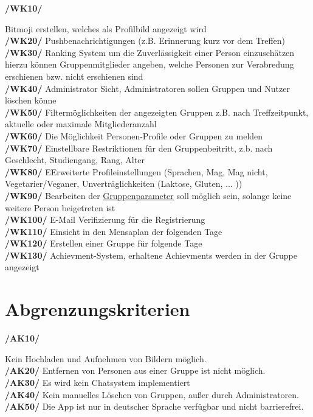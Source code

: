 \documentclass[a4paper]{scrreprt}
\begin{document}
\begin{addmargin}[25pt]{0pt} 
\hypertarget{wk10}{\textbf{/WK10/}} Bitmoji erstellen, welches als Profilbild angezeigt wird \\
\hypertarget{wk20}{\textbf{/WK20/}} Pushbenachrichtigungen (z.B. Erinnerung kurz vor dem Treffen) \\
\hypertarget{wk30}{\textbf{/WK30/}} Ranking System um die Zuverlässigkeit einer Person einzuschätzen \\ 
	hierzu können Gruppenmitglieder angeben, welche Personen zur Verabredung erschienen bzw. nicht erschienen sind\\
\hypertarget{wk40}{\textbf{/WK40/}} Administrator Sicht, Administratoren sollen Gruppen und Nutzer löschen könne\\
\hypertarget{wk50}{\textbf{/WK50/}} Filtermöglichkeiten der angezeigten Gruppen z.B. nach Treffzeitpunkt, aktuelle oder maximale Mitgliederanzahl \\
\hypertarget{wk60}{\textbf{/WK60/}} Die Möglichkeit Personen-Profile oder Gruppen zu melden\\
\hypertarget{wk70}{\textbf{/WK70/}} Einstellbare Restriktionen für den Gruppenbeitritt, z.b. nach Geschlecht, Studiengang, Rang, Alter \\
\hypertarget{wk80}{\textbf{/WK80/}} EErweiterte Profileinstellungen (Sprachen, Mag, Mag nicht, Vegetarier/Veganer, Unverträglichkeiten (Laktose, Gluten, ... ))\\
\hypertarget{wk90}{\textbf{/WK90/}} Bearbeiten der \hyperlink{label2}{Gruppenparameter} soll möglich sein, solange keine weitere Person beigetreten ist\\
\hypertarget{wk100}{\textbf{/WK100/}} E-Mail Verifizierung für die Registrierung\\
\hypertarget{wk110}{\textbf{/WK110/}} Einsicht in den Mensaplan der folgenden Tage\\
\hypertarget{wk120}{\textbf{/WK120/}} Erstellen einer Gruppe für folgende Tage\\
\hypertarget{wk130}{\textbf{/WK130/}} Achievment-System, erhaltene Achievments werden in der Gruppe angezeigt\\
\end{addmargin}
 
\section{Abgrenzungskriterien}

\begin{addmargin}[25pt]{0pt} 
\hypertarget{ak10}{\textbf{/AK10/}} Kein Hochladen und Aufnehmen von Bildern möglich.\\
\hypertarget{ak20}{\textbf{/AK20/}} Entfernen von Personen aus einer Gruppe ist nicht möglich.\\
\hypertarget{ak30}{\textbf{/AK30/}} Es wird kein Chatsystem implementiert\\
\hypertarget{ak40}{\textbf{/AK40/}} Kein manuelles Löschen von Gruppen, außer durch Administratoren.\\
\hypertarget{ak50}{\textbf{/AK50/}} Die App ist nur in deutscher Sprache verfügbar und nicht barrierefrei. \\
\end{addmargin}
\end{document}

